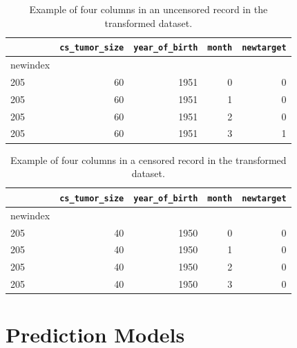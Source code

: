 \documentclass[a4paper,11pt]{article}
\newcommand{\codewhite}[1]{\colorbox{white}{\texttt{#1}}}
\begin{document}
\begin{table}[tbp]
\begin{center}
\begin{tabular}{lrrrr}
\toprule
{} &  \codewhite{cs\_tumor\_size} &  \codewhite{year\_of\_birth} &  \codewhite{month} &  \codewhite{newtarget} \\
\midrule
newindex &                &                &        &            \\
205      &             60 &           1951 &      0 &          0 \\
205      &             60 &           1951 &      1 &          0 \\
205      &             60 &           1951 &      2 &          0 \\
205      &             60 &           1951 &      3 &          1 \\
\bottomrule
\end{tabular}
\caption{\label{tab:transformeddead} Example of four columns in an uncensored record in the transformed dataset.}
\end{center}
\end{table}


\begin{table}[tbp]
\begin{center}
\begin{tabular}{lrrrr}
\toprule
{} &  \codewhite{cs\_tumor\_size} &  \codewhite{year\_of\_birth} &  \codewhite{month} &  \codewhite{newtarget} \\
\midrule
newindex &                &                &        &            \\
205      &             40 &           1950 &      0 &          0 \\
205      &             40 &           1950 &      1 &          0 \\
205      &             40 &           1950 &      2 &          0 \\
205      &             40 &           1950 &      3 &          0 \\
\bottomrule
\end{tabular}
\caption{\label{tab:transformedalive} Example of four columns in a censored record in the transformed dataset.}
\end{center}
\end{table}




\section{Prediction Models}
\end{document}
